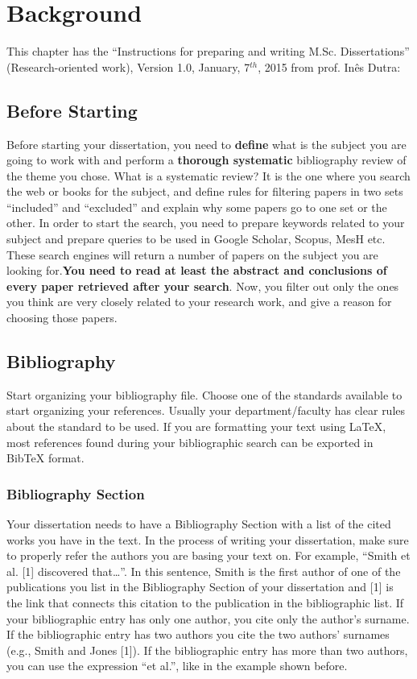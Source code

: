 \chapter{Background}\label{chap:back}

This chapter has the ``Instructions for preparing and writing M.Sc. Dissertations'' (Research-oriented work), 
Version 1.0, January, 7$^{th}$, 2015 from prof. Inês Dutra:

\section{Before Starting}
Before starting your dissertation, you need to \textbf{define} what is the subject you are going to work
with and perform a \textbf{thorough systematic} bibliography review of the theme you chose.
What is a systematic review? It is the one where you search the web or books for the subject, and
define rules for filtering papers in two sets “included” and “excluded” and explain why some papers
go to one set or the other.
In order to start the search, you need to prepare keywords related to your subject and prepare
queries to be used in Google Scholar, Scopus, MesH etc. These search engines will return a number
of papers on the subject you are looking for.\textbf{You need to read at least the abstract and 
conclusions of every paper retrieved after your search}. Now, you filter out only the ones you
think are very closely related to your research work, and give a reason for choosing those papers.

\section{Bibliography}
 Start organizing your bibliography file. Choose one of the standards available to start organizing
your references. Usually your department/faculty has clear rules about the standard to be used. If
you are formatting your text using LaTeX, most references found during your bibliographic search
can be exported in BibTeX format.

\subsection{Bibliography Section}
Your dissertation needs to have a Bibliography Section with a list of the cited works you have in
the text. In the process of writing your dissertation, make sure to properly refer the authors you are
basing your text on. For example, “Smith et al. [1] discovered that\ldots”. In this sentence, Smith is the
first author of one of the publications you list in the Bibliography Section of your dissertation and
[1] is the link that connects this citation to the publication in the bibliographic list. If your
bibliographic entry has only one author, you cite only the author's surname. If the bibliographic
entry has two authors you cite the two authors' surnames (e.g., Smith and Jones [1]). If the
bibliographic entry has more than two authors, you can use the expression “et al.”, like in the
example shown before.

